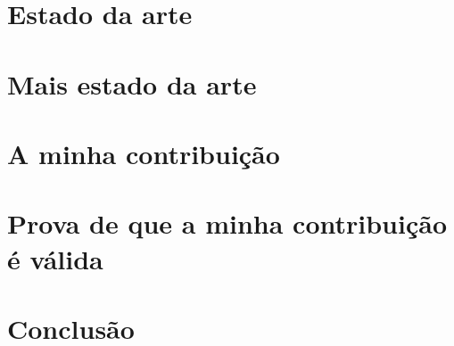 \documentclass[cic,tc]{iiufrgs}
\begin{document}
\chapter{Estado da arte}

\chapter{Mais estado da arte}

\chapter{A minha contribuição}

\chapter{Prova de que a minha contribuição é válida}

\chapter{Conclusão}




\end{document}
